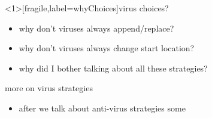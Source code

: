 \usetikzlibrary{shapes.callouts}

\begin{frame}<1>[fragile,label=whyChoices]{virus choices?}
\begin{itemize}
\item why don't viruses always append/replace?
\item why don't viruses always change start location?
\item why did I bother talking about all these strategies?
\end{itemize}
\end{frame}

\begin{frame}{more on virus strategies}
    \begin{itemize}
    \item after we talk about anti-virus strategies some
    \end{itemize}
\end{frame}

